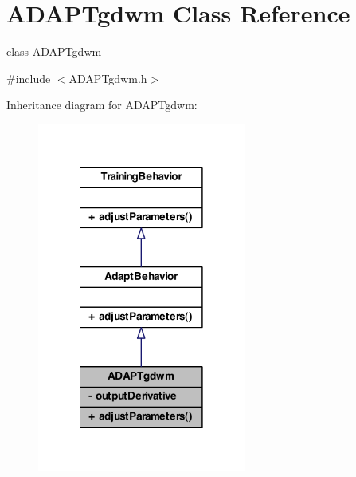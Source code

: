 \hypertarget{class_a_d_a_p_tgdwm}{
\section{ADAPTgdwm Class Reference}
\label{class_a_d_a_p_tgdwm}
}


class \hyperlink{class_a_d_a_p_tgdwm}{ADAPTgdwm} -\/  




{\ttfamily \#include $<$ADAPTgdwm.h$>$}



Inheritance diagram for ADAPTgdwm:\nopagebreak
\begin{figure}[H]
\begin{center}
\leavevmode
\includegraphics[width=194pt]{class_a_d_a_p_tgdwm__inherit__graph}
\end{center}
\end{figure}


